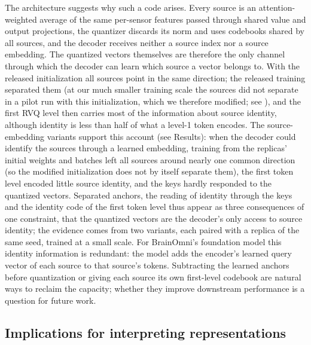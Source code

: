 \documentclass[10pt,letterpaper]{article}
\begin{document}
The architecture suggests why such a code arises. Every source is an attention-weighted
average of the same per-sensor features passed through shared value and output projections, the
quantizer discards its norm and uses codebooks shared by all sources, and the decoder receives
neither a source index nor a source embedding. The quantized vectors themselves are therefore the
only channel through which the decoder can learn which source a vector belongs to. With the
released initialization all sources point in the same direction; the released training separated
them (at our much smaller training scale the sources did not separate in a pilot run with this
initialization, which we therefore modified; see ), and the
first RVQ level then carries most of the information about source identity, although identity is
less than half of what a level-1 token encodes. The source-embedding variants support this account
(see Results): when the decoder could identify the sources through a learned embedding,
training from the replicas' initial weights and batches left all sources around nearly one common
direction (so the modified initialization does not by itself separate them), the first token level encoded little
source identity, and the keys hardly responded to the quantized vectors. Separated anchors, the reading of identity
through the keys and the identity code of the first token level thus appear as three consequences of
one constraint, that the quantized vectors are the decoder's only access to source identity; the
evidence comes from two variants, each paired with a replica of the same seed, trained at a small
scale. For BrainOmni's foundation
model this identity information is redundant: the model adds the encoder's learned query vector
of each source to that source's tokens. Subtracting the learned anchors before quantization or
giving each source its own first-level codebook are natural ways to reclaim the capacity; whether
they improve downstream performance is a question for future work.

\subsection*{Implications for interpreting representations}
\end{document}
